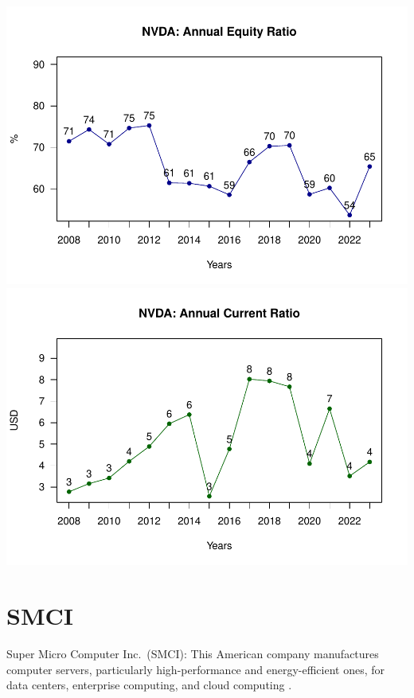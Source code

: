 \documentclass[
]{book}
\begin{document}
\includegraphics{_main_files/figure-latex/unnamed-chunk-1-4.pdf}
\includegraphics{_main_files/figure-latex/unnamed-chunk-1-5.pdf}

\hypertarget{smci}{%
\section{SMCI}\label{smci}}

Super Micro Computer Inc.~(SMCI): This American company manufactures computer servers, particularly high-performance and energy-efficient ones, for data centers, enterprise computing, and cloud computing .
\end{document}
